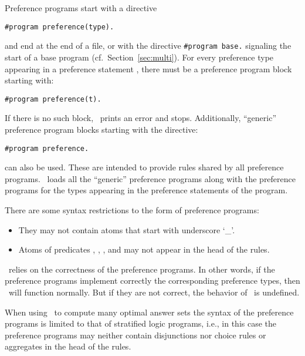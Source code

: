 \begin{note}
Preference programs start with a directive
\begin{lstlisting}[numbers=none]
#program preference(type).
\end{lstlisting}
and end at the end of a file, or with the directive
\lstinline{#program base.}
signaling the start of a base program (cf.~Section~\ref{sec:multi}). 
For every preference type  appearing in a preference statement , 
there must be a preference program block starting with:
\begin{lstlisting}[numbers=none]
#program preference(t).
\end{lstlisting}
If there is no such block, \asprin\ prints an error and stops.
Additionally, ``generic'' preference program blocks starting with the directive: 
\begin{lstlisting}[numbers=none]
#program preference.
\end{lstlisting}
can also be used. 
These are intended to provide rules shared by all preference programs.
\asprin\ loads all the ``generic'' preference programs along with 
the preference programs for the types appearing in the preference statements of the program.
\end{note}

\begin{note}
There are some syntax restrictions to the form of preference programs:
\begin{itemize}
\item They may not contain atoms that start with underscore `\_'.
\item Atoms of predicates , , 
      ,  and 
      may not appear in the head of the rules.
\end{itemize}
\end{note}

\begin{note}
\asprin\ relies on the correctness of the preference programs. 
In other words, 
if the preference programs implement correctly the corresponding preference types, 
then \asprin\ will function normally.
But if they are not correct, the behavior of \asprin\ is undefined.
\end{note}

\begin{note}
When using \asprin\ to compute many optimal answer sets the syntax of the preference programs
is limited to that of stratified logic programs, 
i.e., in this case the preference programs may neither contain disjunctions 
nor choice rules or aggregates in the head of the rules.
\end{note}

